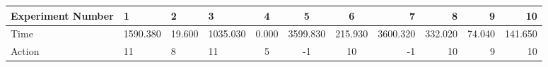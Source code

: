 \documentclass[8pt]{article}
\begin{document}
\begin{landscape}
\begin{tabular}{ | l | l | l | l | c | c | c | r | r | r | r | }
 \hline 
Experiment Number & 1 & 2 & 3 & 4 & 5 & 6 & 7 & 8 & 9 & 10\\ \hline
Time & 1590.380 & 19.600 & 1035.030 & 0.000 & 3599.830 & 215.930 & 3600.320 & 332.020 & 74.040 & 141.650\\ \hline
Action & 11 & 8 & 11 & 5 & -1 & 10 & -1 & 10 & 9 & 10\\ \hline\end{tabular}
\end{landscape}
\end{document}
